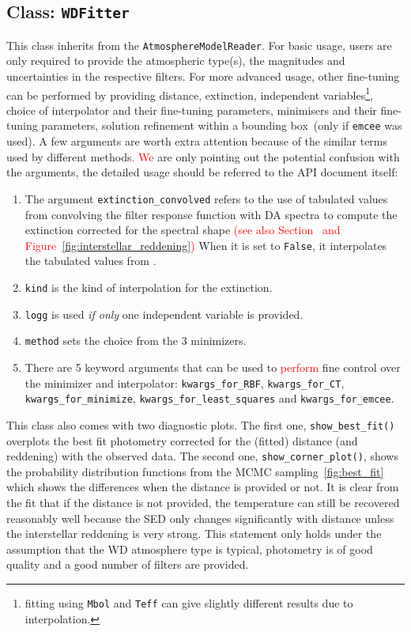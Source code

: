 \documentclass[fleqn,usenatbib]{rasti}
\begin{document}
\subsection{Class: \texttt{WDFitter}}
\label{sec:wdfitter}
This class inherits from the \verb+AtmosphereModelReader+. For basic usage,
users are only required to provide the atmospheric type(s), the magnitudes and
uncertainties in the respective filters. For more advanced usage, other
fine-tuning can be performed by providing distance, extinction, independent
variables\footnote{fitting using \texttt{Mbol} and \texttt{Teff} can give slightly
different results due to interpolation.}, choice of interpolator and their
fine-tuning parameters, minimisers and their fine-tuning parameters,
solution refinement within a bounding box~(only if \verb+emcee+ was used).
A few arguments are worth extra attention because of the similar terms used
by different methods\textcolor{red}{. We} are only pointing out the potential confusion with
the arguments, the detailed usage should be referred to the API document
itself:
\begin{enumerate}
    \item The argument \verb+extinction_convolved+ refers to the use of
    tabulated values from convolving the filter response function with DA
    spectra to compute the extinction corrected for the spectral shape
    \textcolor{red}{(see also Section~ and
    Figure~\ref{fig:interstellar_reddening})}
    When it is set to \verb+False+, it interpolates the tabulated values
    from \citet{2011ApJ...737..103S}.
    \item \verb+kind+ is the kind of interpolation for the extinction.
    \item \verb+logg+ is used \textit{if only} one independent variable is
    provided.
    \item \verb+method+ sets the choice from the 3 minimizers.
    \item There are 5 keyword arguments that can be used to
    \textcolor{red}{perform} fine control over the minimizer and
    interpolator: \verb+kwargs_for_RBF+, \verb+kwargs_for_CT+,
    \verb+kwargs_for_minimize+, \verb+kwargs_for_least_squares+ and
    \verb+kwargs_for_emcee+.
\end{enumerate}

This class also comes with two diagnostic plots. The first one,
\verb+show_best_fit()+ overplots the best fit photometry corrected for the
(fitted) distance (and reddening) with the observed
data. The second one, \verb+show_corner_plot()+,
shows the probability distribution functions from the MCMC
sampling~\ref{fig:best_fit} which shows the differences when the distance
is provided or not. It is clear from the fit that if the distance is not
provided, the temperature can still be recovered reasonably well because
the SED only changes significantly with distance unless the interstellar
reddening is very strong. This statement only holds under the assumption
that the WD atmosphere type is typical, photometry is of good quality and
a good number of filters are provided.
\end{document}
